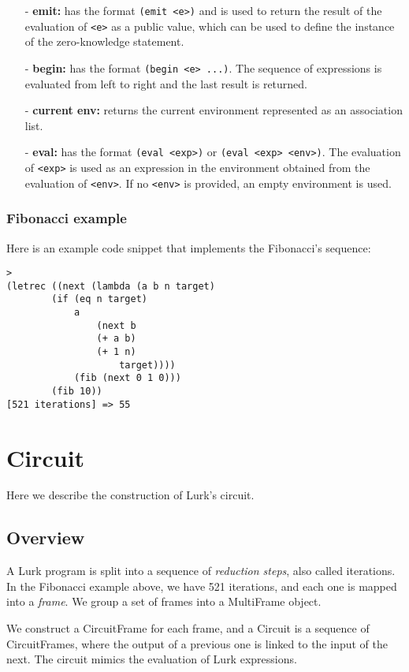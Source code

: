 \documentclass[10pt, english]{article}
\begin{document}
\begin{itemize}
  \item[-] \textbf{emit:} has the format \verb|(emit <e>)| and is used to return the result of the evaluation of \verb|<e>| as a public value, which can be used to define the instance of the zero-knowledge statement.
  \item[-] \textbf{begin:} has the format \verb|(begin <e> ...)|. The sequence of expressions is evaluated from left to right and the last result is returned.
  \item[-] \textbf{current env:} returns the current environment represented as an association list.
  \item[-] \textbf{eval:} has the format \verb|(eval <exp>)| or \verb|(eval <exp> <env>)|. The evaluation of \verb|<exp>| is used as an expression in the environment obtained from the evaluation of \verb|<env>|. If no \verb|<env>| is provided, an empty environment is used.
\end{itemize}

\subsubsection{Fibonacci example}

Here is an example code snippet that implements the Fibonacci's sequence:

\begin{verbatim}
>
(letrec ((next (lambda (a b n target)
        (if (eq n target)
            a
                (next b
                (+ a b)
                (+ 1 n)
                    target))))
            (fib (next 0 1 0)))
        (fib 10))
[521 iterations] => 55
\end{verbatim}

\section{Circuit}

Here we describe the construction of Lurk's circuit.

\subsection{Overview}

A Lurk program is split into a sequence of \textit{reduction steps}, also called iterations. In the Fibonacci example above, we have 521 iterations, and each one is mapped into a \textit{frame}. We group a set of frames into a MultiFrame object.

We construct a CircuitFrame for each frame, and a Circuit is a sequence of CircuitFrames, where the output of a previous one is linked to the input of the next. The circuit mimics the evaluation of Lurk expressions.
\end{document}
